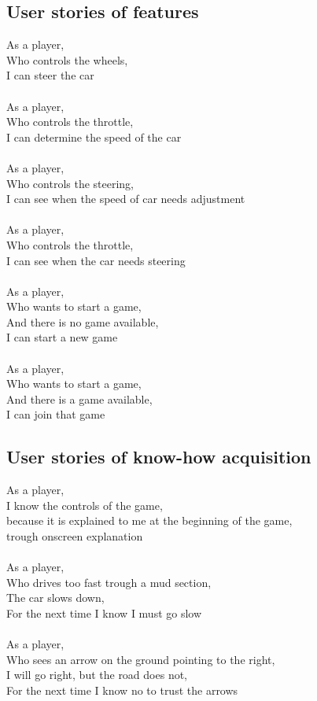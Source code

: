 \documentclass{article}
\begin{document}
\subsection{User stories of features}
As a player,\\
Who controls the wheels,\\
I can steer the car\\
\\
As a player,\\
Who controls the throttle,\\
I can determine the speed of the car\\
\\
As a player,\\
Who controls the steering,\\
I can see when the speed of car needs adjustment\\
\\
As a player,\\
Who controls the throttle,\\
I can see when the car needs steering\\
\\
As a player,\\
Who wants to start a game,\\
And there is no game available,\\
I can start a new game\\
\\
As a player,\\
Who wants to start a game,\\
And there is a game available,\\
I can join that game\\

\subsection{User stories of know-how acquisition}
As a player,\\
I know the controls of the game,\\
because it is explained to me at the beginning of the game,\\
trough onscreen explanation\\
\\
As a player,\\
Who drives too fast trough a mud section,\\
The car slows down,\\
For the next time I know I must go slow\\
\\
As a player,\\
Who sees an arrow on the ground pointing to the right,\\
I will go right, but the road does not,\\
For the next time I know no to trust the arrows
\end{document}
